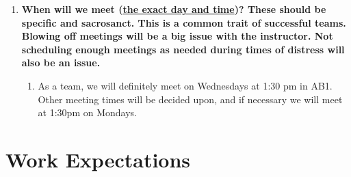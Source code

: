 \documentclass[12pt]{article}
\begin{document}
\begin{enumerate}
    \item \textbf{When will we meet (\underline{the exact day and time})? These should be specific and sacrosanct. This is a common trait of successful teams. Blowing off meetings will be a big issue with the instructor. Not scheduling enough meetings as needed during times of distress will also be an issue.}
    \begin{enumerate}
        \item As a team, we will definitely meet on Wednesdays at 1:30 pm in AB1. Other meeting times will be decided upon, and if necessary we will meet at 1:30pm on Mondays.
    \end{enumerate}
\end{enumerate}

\section{Work Expectations}
\end{document}
